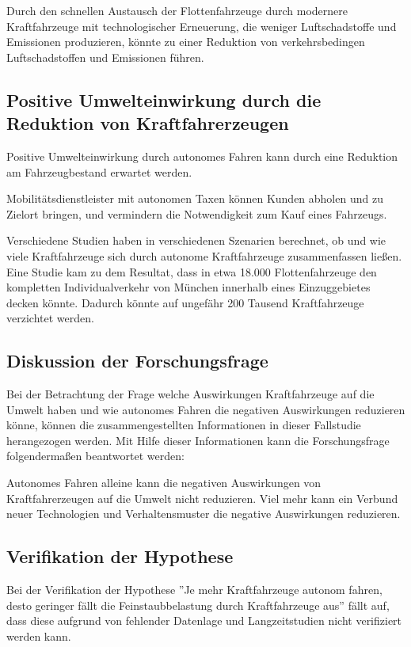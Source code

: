 Durch den schnellen Austausch der Flottenfahrzeuge durch modernere Kraftfahrzeuge mit technologischer Erneuerung,
die weniger Luftschadstoffe und Emissionen produzieren, könnte zu einer Reduktion von verkehrsbedingen Luftschadstoffen und Emissionen führen.

\subsection{Positive Umwelteinwirkung durch die Reduktion von Kraftfahrerzeugen}
Positive Umwelteinwirkung durch autonomes Fahren kann durch eine
Reduktion am Fahrzeugbestand erwartet werden.

Mobilitätsdienstleister mit autonomen Taxen können
Kunden abholen und zu Zielort bringen,
und vermindern die Notwendigkeit zum Kauf eines Fahrzeugs.

Verschiedene Studien haben in verschiedenen Szenarien berechnet, ob und wie viele Kraftfahrzeuge sich durch autonome Kraftfahrzeuge zusammenfassen ließen.
Eine Studie kam zu dem Resultat, dass in etwa 18.000 Flottenfahrzeuge den kompletten Individualverkehr von München innerhalb eines Einzuggebietes decken könnte.
Dadurch könnte auf ungefähr 200 Tausend Kraftfahrzeuge verzichtet werden.
\cite{infrastrukturen}
\newpage

\subsection{Diskussion der Forschungsfrage}
Bei der Betrachtung der Frage welche Auswirkungen Kraftfahrzeuge auf die Umwelt haben und wie autonomes Fahren die negativen Auswirkungen reduzieren könne,
können die zusammengestellten Informationen in dieser Fallstudie herangezogen werden.
Mit Hilfe dieser Informationen kann die Forschungsfrage folgendermaßen beantwortet werden:

Autonomes Fahren alleine kann die negativen Auswirkungen von Kraftfahrerzeugen auf die Umwelt nicht reduzieren.
Viel mehr kann ein Verbund neuer Technologien und Verhaltensmuster die negative Auswirkungen reduzieren.

\subsection{Verifikation der Hypothese}
Bei der Verifikation der Hypothese ''Je mehr Kraftfahrzeuge
autonom fahren, desto geringer fällt die Feinstaubbelastung durch Kraftfahrzeuge aus''
fällt auf, dass diese aufgrund von fehlender Datenlage und Langzeitstudien nicht verifiziert werden kann.
